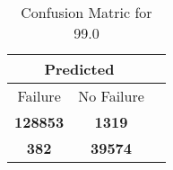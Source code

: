 \begin{table}[] 
\label{Table: Prediction Accuracy-DMD99.0OnlySunEKF-resetReflection-Reflection} 
\caption{Confusion Matric for 99.0} 
\centering 
\begin{tabular} 
 {@{}ccc@{}} 
\toprule 
\multicolumn{2}{c}{\textbf{Predicted}}
 \\ \midrule 
\multicolumn{1}{|c|}{Failure} & 
\multicolumn{1}{c|}{No Failure}
 \\ \midrule 
\multicolumn{1}{|c|}{\color{green}\textbf{128853}} & 
\multicolumn{1}{c|}{\color{red}\textbf{1319}}
 \\ \midrule 
\multicolumn{1}{|c|}{\color{red}\textbf{382}} & 
\multicolumn{1}{c|}{\color{green}\textbf{39574}}
 \\ \bottomrule 
\end{tabular} 
\end{table} 
